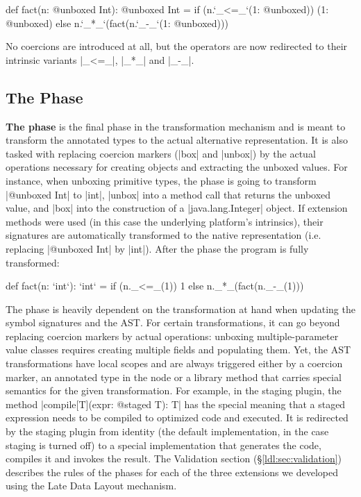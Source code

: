 \begin{lstlisting-nobreak}
 def fact(n: @unboxed Int): @unboxed Int =
   if (n.`_<=_`(1: @unboxed))
     (1: @unboxed)
   else
     n.`_*_`(fact(n.`_-_`(1: @unboxed)))
\end{lstlisting-nobreak}

No coercions are introduced at all, but the operators are now redirected to their intrinsic variants |_<=_|, |_*_| and |_-_|.

\subsection{The \Commit{} Phase}
\label{ldl:sec:transform:commit}

\textbf{The \commit{} phase} is the final phase in the transformation mechanism and is meant to transform the annotated types to the actual alternative representation. It is also tasked with replacing coercion markers (|box| and |unbox|) by the actual operations necessary for creating objects and extracting the unboxed values. For instance, when unboxing primitive types, the \commit{} phase is going to transform |@unboxed Int| to |int|, |unbox| into a method call that returns the unboxed value, and |box| into the construction of a |java.lang.Integer| object. If extension methods were used (in this case the underlying platform's intrinsics), their signatures are automatically transformed to the native representation (i.e. replacing |@unboxed Int| by |int|). After the \commit{} phase the program is fully transformed:

\begin{lstlisting-nobreak}
 def fact(n: `int`): `int` =
   if (n._<=_(1))
     1
   else
     n._*_(fact(n._-_(1)))
\end{lstlisting-nobreak}

The \commit{} phase is heavily dependent on the transformation at hand when updating the symbol signatures and the AST. For certain transformations, it can go beyond replacing coercion markers by actual operations: unboxing multiple-parameter value classes requires creating multiple fields and populating them. Yet, the AST transformations have local scopes and are always triggered either by a coercion marker, an annotated type in the node or a library method that carries special semantics for the given transformation. For example, in the staging plugin, the method |compile[T](expr: @staged T): T| has the special meaning that a staged expression needs to be compiled to optimized code and executed. It is redirected by the staging plugin from identity (the default implementation, in the case staging is turned off) to a special implementation that generates the code, compiles it and invokes the result. The Validation section (\S\ref{ldl:sec:validation}) describes the rules of the \commit{} phases for each of the three extensions we developed using the Late Data Layout mechanism.

